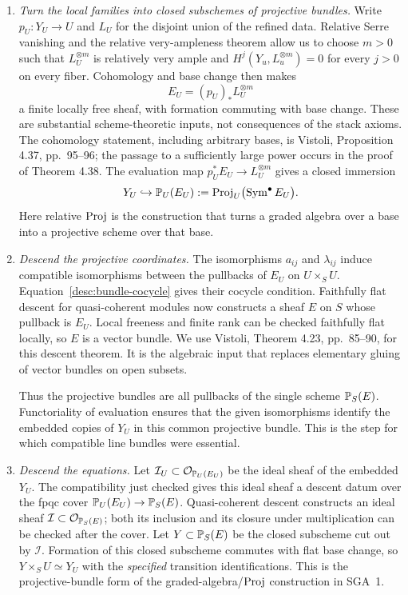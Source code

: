 \begin{enumerate}
\item \emph{Turn the local families into closed subschemes of projective
bundles.}
Write $p_U:Y_U\to U$ and $L_U$ for the disjoint union of the refined
data. Relative Serre vanishing and the relative very-ampleness theorem
allow us to choose $m>0$ such that $L_U^{\otimes m}$ is relatively very
ample and $H^j(Y_u,L_u^{\otimes m})=0$ for every $j>0$ on every fiber. Cohomology and
base change then makes
\[
 E_U=(p_U)_*L_U^{\otimes m}
\]
a finite locally free sheaf, with formation commuting with base change.
These are substantial scheme-theoretic inputs, not consequences of the
stack axioms. The cohomology statement, including arbitrary bases, is
Vistoli, Proposition 4.37, pp.~95--96; the passage to a sufficiently
large power occurs in the proof of Theorem 4.38. The evaluation map
$p_U^*E_U\to L_U^{\otimes m}$ gives a closed immersion
\[
 Y_U\hookrightarrow\mathbb P_U(E_U)
           :=\operatorname{Proj}_U\bigl(\operatorname{Sym}^{\bullet}E_U\bigr).
\]
Here relative $\operatorname{Proj}$ is the construction that turns a graded algebra
over a base into a projective scheme over that base.

\item \emph{Descend the projective coordinates.}
The isomorphisms $a_{ij}$ and $\lambda_{ij}$ induce compatible
isomorphisms between the pullbacks of $E_U$ on $U\times_S U$.
Equation~\eqref{desc:bundle-cocycle} gives their cocycle condition.
Faithfully flat descent for quasi-coherent modules now constructs a
sheaf $E$ on $S$ whose pullback is $E_U$. Local freeness and finite rank
can be checked faithfully flat locally, so $E$ is a vector bundle.
We use Vistoli, Theorem 4.23, pp.~85--90, for this descent theorem.
It is the algebraic input that replaces elementary gluing of vector
bundles on open subsets.

Thus the projective bundles are all pullbacks of the single scheme
$\mathbb P_S(E)$. Functoriality of evaluation ensures that the given
isomorphisms identify the embedded copies of $Y_U$ in this common
projective bundle. This is the step for which compatible line bundles
were essential.

\item \emph{Descend the equations.}
Let $\mathcal I_U\subset\mathcal O_{\mathbb P_U(E_U)}$ be the ideal sheaf
of the embedded $Y_U$. The compatibility just checked gives this ideal
sheaf a descent datum over the fpqc cover
$\mathbb P_U(E_U)\to\mathbb P_S(E)$. Quasi-coherent descent constructs an ideal
sheaf $\mathcal I\subset\mathcal O_{\mathbb P_S(E)}$; both its inclusion
and its closure under multiplication can be checked after the cover.
Let $Y\subset\mathbb P_S(E)$ be the closed subscheme cut out by
$\mathcal I$. Formation of this closed subscheme commutes with flat
base change, so $Y\times_S U\simeq Y_U$ with the \emph{specified}
transition identifications. This is the projective-bundle form of the
graded-algebra/$\operatorname{Proj}$ construction in SGA~1.


\end{enumerate}
